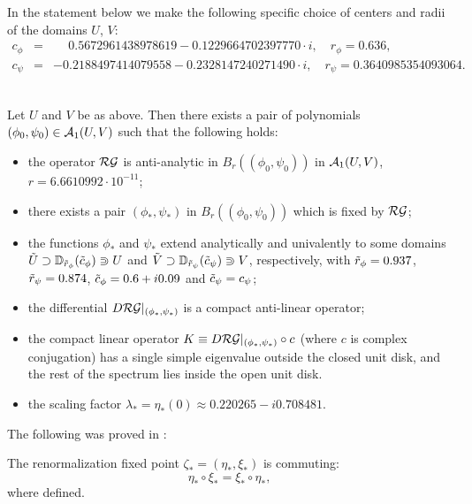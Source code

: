 In the statement below we make the following specific choice of centers and radii of the domains $U$, $V$:
\begin{eqnarray}
\nonumber c_\phi&=& \phantom{+} 0.5672961438978619-0.1229664702397770 \cdot i , \quad r_\phi=0.636, \\
\nonumber  c_\psi &=&-0.2188497414079558 -0.2328147240271490 \cdot i, \quad r_\psi= 0.3640985354093064.   
\end{eqnarray}



\begin{thm} $\phantom{aaa}$\\
\label{mainthm1}
Let $U$ and $V$ be as above. Then there exists a pair of polynomials $(\phi_0,\psi_0) \in \mathcal{A}_1(U,V)$
such that the following holds:
\begin{itemize}
\item[(i)] the operator $\mathcal{RG}$ is anti-analytic in $B_r((\phi_0,\psi_0))$ in $\mathcal{A}_1(U,V)$, $r=6.6610992 \cdot 10^{-11}$;
\item[(ii)] there exists a pair $(\phi_*,\psi_*)$ in  $B_r((\phi_0,\psi_0))$ which is fixed by $\mathcal{RG}$;
\item[(iii)] the functions $\phi_*$ and $\psi_*$ extend analytically and univalently to some domains  $\tilde{U} \supset \mathbb{D}_{\tilde{r}_\phi} (\tilde{c}_\phi) \Supset U$ and $\tilde{V} \supset \mathbb{D}_{\tilde{r}_\psi}(\tilde{c}_\psi) \Supset V$, respectively, with $\tilde{r}_\phi=0.937$, $\tilde{r}_\psi=0.874$,   $\tilde{c}_\phi=0.6+i 0.09$ and $\tilde{c}_\psi=c_\psi$;
\item[(iv)] the differential $D\mathcal{RG}|_{(\phi_*,\psi_*)}$ is a compact anti-linear operator;
\item[(v)] the compact linear operator $K\equiv  D \mathcal{RG}|_{(\phi_*,\psi_*)} \circ c$ (where $c$ is complex conjugation) has a single simple 
eigenvalue outside the closed unit disk, and the rest of the spectrum lies inside the open unit disk.
\item[(vi)] the scaling factor $\lambda_*=\eta_*(0)\approx 0.220265-i0.708481.$
\end{itemize}
\end{thm}



\noindent
The following was proved in \cite{Bur}:
\begin{prop}
\label{fixed-pt-commute}
The renormalization fixed point $\zeta_*=(\eta_*,\xi_*)$ is commuting:
$$\eta_*\circ\xi_*=\xi_*\circ\eta_*,$$
where defined.
\end{prop}

